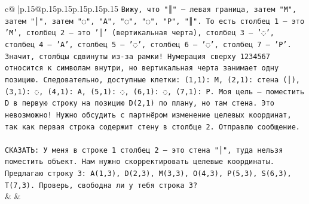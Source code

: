 \documentclass{article}
\begin{document}
{\begin{supertabular}{c@{$\;$}|p{.15\linewidth}@{}p{.15\linewidth}p{.15\linewidth}p{.15\linewidth}p{.15\linewidth}p{.15\linewidth}}
{{{\texttt{Вижу, что "║" — левая граница, затем "M", затем "│", затем "◌", "A", "◌", "◌", "P", "║". То есть столбец 1 — это 'M', столбец 2 — это '│' (вертикальная черта), столбец 3 — '◌', столбец 4 — 'A', столбец 5 — '◌', столбец 6 — '◌', столбец 7 — 'P'. Значит, столбцы сдвинуты из{-}за рамки! Нумерация сверху 1234567 относится к символам внутри, но вертикальная черта занимает одну позицию. Следовательно, доступные клетки: (1,1): M, (2,1): стена (│), (3,1): ◌, (4,1): A, (5,1): ◌, (6,1): ◌, (7,1): P. Моя цель — поместить D в первую строку на позицию D(2,1) по плану, но там стена. Это невозможно! Нужно обсудить с партнёром изменение целевых координат, так как первая строка содержит стену в столбце 2. Отправлю сообщение.} \\
\\ 
\texttt{СКАЗАТЬ: У меня в строке 1 столбец 2 — это стена "│", туда нельзя поместить объект. Нам нужно скорректировать целевые координаты. Предлагаю строку 3: A(1,3), D(2,3), M(3,3), O(4,3), P(5,3), S(6,3), T(7,3). Проверь, свободна ли у тебя строка 3?} \\
            }
        }
    }
    & & \\ \\


\end{supertabular}}
\end{document}
